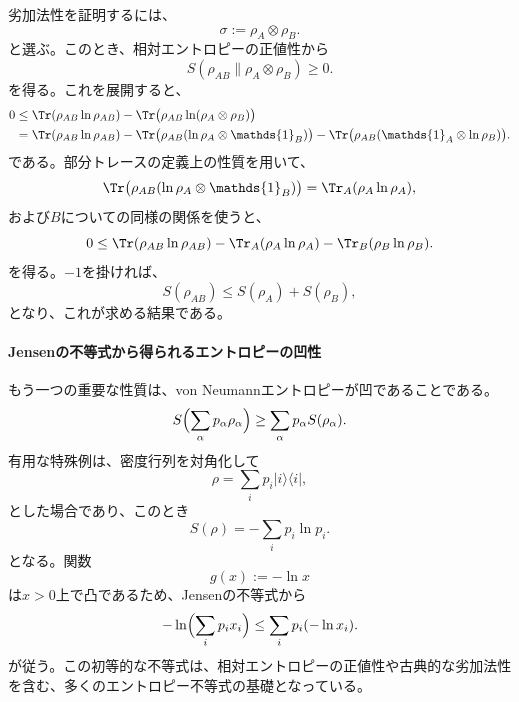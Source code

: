 \documentclass[a4paper,11pt,oneside]{article}
\theoremstyle{definition}
\numberwithin{equation}{section}
\begin{document}
劣加法性を証明するには、
\begin{equation}
\sigma := \rho_A \otimes \rho_B .
\end{equation}
と選ぶ。このとき、相対エントロピーの正値性から
\begin{equation}
S(\rho_{AB}\|\rho_A\otimes\rho_B)\ge 0 .
\end{equation}
を得る。これを展開すると、
\begin{align}
0
&\le
\Tr(\rho_{AB}\ln\rho_{AB})
-
\Tr\bigl(\rho_{AB}\ln(\rho_A\otimes\rho_B)\bigr)
\nonumber\\
&=
\Tr(\rho_{AB}\ln\rho_{AB})
-
\Tr\bigl(\rho_{AB}(\ln\rho_A\otimes \mathds{1} _B)\bigr)
-
\Tr\bigl(\rho_{AB}(\mathds{1} _A\otimes \ln\rho_B)\bigr) .
\end{align}
である。部分トレースの定義上の性質を用いて、
\begin{equation}
\Tr\bigl(\rho_{AB}(\ln\rho_A\otimes \mathds{1} _B)\bigr)
=
\Tr_A(\rho_A\ln\rho_A) ,
\end{equation}
および$B$についての同様の関係を使うと、
\begin{equation}
0
\le
\Tr(\rho_{AB}\ln\rho_{AB})
-
\Tr_A(\rho_A\ln\rho_A)
-
\Tr_B(\rho_B\ln\rho_B) .
\end{equation}
を得る。$-1$を掛ければ、
\begin{equation}
S(\rho_{AB}) \le S(\rho_A)+S(\rho_B) ,
\end{equation}
となり、これが求める結果である。



\paragraph{Jensenの不等式から得られるエントロピーの凹性}



もう一つの重要な性質は、von Neumannエントロピーが凹であることである。
\begin{equation}
S\Bigl(\sum_\alpha p_\alpha \rho_\alpha\Bigr)
\ge
\sum_\alpha p_\alpha S(\rho_\alpha) .
\end{equation}
有用な特殊例は、密度行列を対角化して
\begin{equation}
\rho = \sum_i p_i |i\rangle\langle i| ,
\end{equation}
とした場合であり、このとき
\begin{equation}
S(\rho)= -\sum_i p_i \ln p_i .
\end{equation}
となる。関数
\begin{equation}
g(x):= -\ln x
\end{equation}
は$x>0$上で凸であるため、Jensenの不等式から
\begin{equation}
-\ln\Bigl(\sum_i p_i x_i\Bigr)\le \sum_i p_i (-\ln x_i) .
\end{equation}
が従う。この初等的な不等式は、相対エントロピーの正値性や古典的な劣加法性を含む、多くのエントロピー不等式の基礎となっている。
\end{document}

